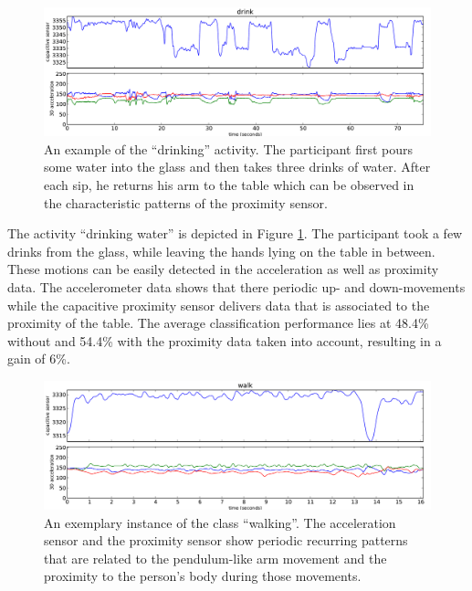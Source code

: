 \documentclass[runningheads,a4paper]{llncs}
\begin{document}
\begin{figure}[t]
	\centering
		\includegraphics[width=\textwidth]{../Auswertung/images/eugen_7.pdf}
	\caption{An example of the ``drinking'' activity. The participant first pours some water into the glass and then takes three drinks of water. After each sip, he returns his arm to the table which can be observed in the characteristic patterns of the proximity sensor.}
	\label{fig:drinking}
\end{figure}

The activity ``drinking water'' is depicted in Figure \ref{fig:drinking}. The participant took a few drinks from the glass, while leaving the hands lying on the table in between. These motions can be easily detected in the acceleration as well as proximity data. The accelerometer data shows that there periodic up- and down-movements while the capacitive proximity sensor delivers data that is associated to the proximity of the table. The average classification performance lies at 48.4\% without and 54.4\% with the proximity data taken into account, resulting in a gain of 6\%.

\begin{figure}
	\centering
		\includegraphics[width=1.00\textwidth]{../Auswertung/images/marko_8.pdf}
	\caption{An exemplary instance of the class ``walking''. The acceleration sensor and the proximity sensor show periodic recurring patterns that are related to the pendulum-like arm movement and the proximity to the person's body during those movements.}
	\label{fig:walking}
\end{figure}
\end{document}

